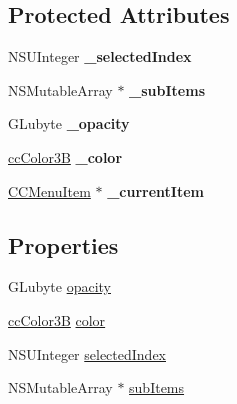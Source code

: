 \subsection*{Protected Attributes}
\begin{DoxyCompactItemize}
\item 
\hypertarget{interface_c_c_menu_item_toggle_a71ec036904177b9da87d68bc14cede60}{N\-S\-U\-Integer {\bfseries \-\_\-selected\-Index}}\label{interface_c_c_menu_item_toggle_a71ec036904177b9da87d68bc14cede60}

\item 
\hypertarget{interface_c_c_menu_item_toggle_a2fecf9964097aafb951f8ebbe6a83bbc}{N\-S\-Mutable\-Array $\ast$ {\bfseries \-\_\-sub\-Items}}\label{interface_c_c_menu_item_toggle_a2fecf9964097aafb951f8ebbe6a83bbc}

\item 
\hypertarget{interface_c_c_menu_item_toggle_a5796ca2e5026b6f2a4195987ff98d725}{G\-Lubyte {\bfseries \-\_\-opacity}}\label{interface_c_c_menu_item_toggle_a5796ca2e5026b6f2a4195987ff98d725}

\item 
\hypertarget{interface_c_c_menu_item_toggle_a0aaee96465ca95e54b2805795a859c84}{\hyperlink{cc_types_8h_a829b00c53e72f0115e3880cb508fec1e}{cc\-Color3\-B} {\bfseries \-\_\-color}}\label{interface_c_c_menu_item_toggle_a0aaee96465ca95e54b2805795a859c84}

\item 
\hypertarget{interface_c_c_menu_item_toggle_a0807434df57f9972b4a7eace914fcfe7}{\hyperlink{interface_c_c_menu_item}{C\-C\-Menu\-Item} $\ast$ {\bfseries \-\_\-current\-Item}}\label{interface_c_c_menu_item_toggle_a0807434df57f9972b4a7eace914fcfe7}

\end{DoxyCompactItemize}
\subsection*{Properties}
\begin{DoxyCompactItemize}
\item 
G\-Lubyte \hyperlink{interface_c_c_menu_item_toggle_a967a6de8d333f8053a4c586d97e99c6f}{opacity}
\item 
\hyperlink{cc_types_8h_a829b00c53e72f0115e3880cb508fec1e}{cc\-Color3\-B} \hyperlink{interface_c_c_menu_item_toggle_adbba1a59d4f0258b90d9c695b584a6fe}{color}
\item 
N\-S\-U\-Integer \hyperlink{interface_c_c_menu_item_toggle_adca18155325c3693317fa1b472dc6078}{selected\-Index}
\item 
N\-S\-Mutable\-Array $\ast$ \hyperlink{interface_c_c_menu_item_toggle_a4f859da10f4904195ecf420297d8aa78}{sub\-Items}
\end{DoxyCompactItemize}


